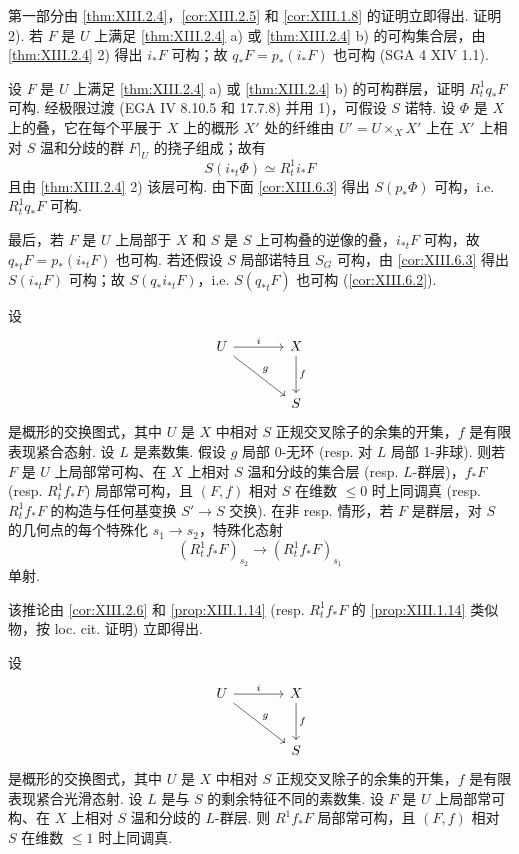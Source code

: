 第一部分由 \ref{thm:XIII.2.4}，\ref{cor:XIII.2.5} 和 \ref{cor:XIII.1.8} 的证明立即得出. 证明 2). 若 $F$ 是 $U$ 上满足 \ref{thm:XIII.2.4} a) 或 \ref{thm:XIII.2.4} b) 的可构集合层，由 \ref{thm:XIII.2.4} 2) 得出 $i_* F$ 可构；故 $q_* F = p_*(i_* F)$ 也可构 (SGA 4 XIV 1.1).

设 $F$ 是 $U$ 上满足 \ref{thm:XIII.2.4} a) 或 \ref{thm:XIII.2.4} b) 的可构群层，证明 $R^1_t q_* F$ 可构. 经极限过渡 (EGA IV 8.10.5 和 17.7.8) 并用 1)，可假设 $S$ 诺特. 设 $\Phi$ 是 $X$ 上的叠，它在每个平展于 $X$ 上的概形 $X'$ 处的纤维由 $U' = U \times_X X'$ 上在 $X'$ 上相对 $S$ 温和分歧的群 $F|_U$ 的挠子组成；故有
\[
S(i_{*t} \Phi) \simeq R^1_t i_* F
\]
且由 \ref{thm:XIII.2.4} 2) 该层可构. 由下面 \ref{cor:XIII.6.3} 得出 $S(p_* \Phi)$ 可构，i.e. $R^1_t q_* F$ 可构.

最后，若 $F$ 是 $U$ 上局部于 $X$ 和 $S$ 是 $S$ 上可构叠的逆像的叠，$i_{*t} F$ 可构，故 $q_{*t} F = p_*(i_{*t} F)$ 也可构. 若还假设 $S$ 局部诺特且 $S_G$ 可构，由 \ref{cor:XIII.6.3} 得出 $S(i_{*t} F)$ 可构；故 $S(q_* i_{*t} F)$，i.e. $S(q_{*t} F)$ 也可构 (\cref{cor:XIII.6.2}).

\begin{corollary}\label{cor:XIII.2.8}
设
\[
\begin{tikzcd}[row sep=large, column sep=large]
U \arrow[r,"i"] \arrow[dr,"g"] & X \arrow[d,"f"] \\
& S
\end{tikzcd}
\]
是概形的交换图式，其中 $U$ 是 $X$ 中相对 $S$ 正规交叉除子的余集的开集，$f$ 是有限表现紧合态射. 设 $L$ 是素数集. 假设 $g$ 局部 0-无环 (resp. 对 $L$ 局部 1-非球). 则若 $F$ 是 $U$ 上局部常可构、在 $X$ 上相对 $S$ 温和分歧的集合层 (resp. $L$-群层)，$f_* F$ (resp. $R^1_t f_* F$) 局部常可构，且 $(F, f)$ 相对 $S$ 在维数 $\leqslant 0$ 时上同调真 (resp. $R^1_t f_* F$ 的构造与任何基变换 $S' \to S$ 交换). 在非 resp. 情形，若 $F$ 是群层，对 $S$ 的几何点的每个特殊化 $s_1 \to s_2$，特殊化态射
\[
(R^1_t f_* F)_{s_2} \longrightarrow (R^1_t f_* F)_{s_1}
\]
单射.
\end{corollary}

该推论由 \ref{cor:XIII.2.6} 和 \ref{prop:XIII.1.14} (resp. $R^1_t f_* F$ 的 \ref{prop:XIII.1.14} 类似物，按 loc. cit. 证明) 立即得出.

\begin{corollary}\label{cor:XIII.2.9}
设
\[
\begin{tikzcd}[row sep=large, column sep=large]
U \arrow[r,"i"] \arrow[dr,"g"] & X \arrow[d,"f"] \\
& S
\end{tikzcd}
\]
是概形的交换图式，其中 $U$ 是 $X$ 中相对 $S$ 正规交叉除子的余集的开集，$f$ 是有限表现紧合光滑态射. 设 $L$ 是与 $S$ 的剩余特征不同的素数集. 设 $F$ 是 $U$ 上局部常可构、在 $X$ 上相对 $S$ 温和分歧的 $L$-群层. 则 $R^1 f_* F$ 局部常可构，且 $(F, f)$ 相对 $S$ 在维数 $\leqslant 1$ 时上同调真.
\end{corollary}

